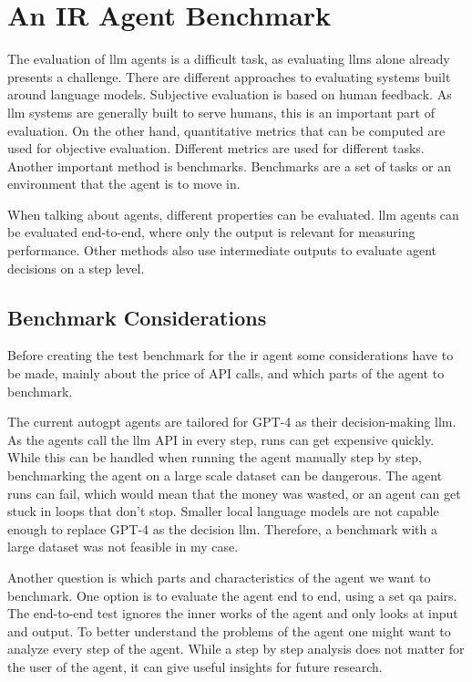 \documentclass[../main.tex]{subfiles}
\begin{document}
\chapter{An IR Agent Benchmark}
\label{ch:benchmarks}

The evaluation of \gls{llm} agents is a difficult task,
as evaluating \glspl{llm} alone already presents a challenge. %
There are different approaches to evaluating systems built around language models.
Subjective evaluation is based on human feedback.
As \gls{llm} systems are generally built to serve humans, this is an important part of evaluation.
On the other hand,
quantitative metrics that can be computed are used for objective evaluation.
Different metrics are used for different tasks. Another important method is benchmarks.
Benchmarks are a set of tasks or an environment that the agent is to move in.

When talking about agents, different properties can be evaluated.
\gls{llm} agents can be evaluated end-to-end, where only the output is
relevant for measuring performance.
Other methods also use intermediate outputs to evaluate agent decisions on a step level.

\section{Benchmark Considerations}

Before creating the test benchmark for the \gls{ir} agent some considerations
have to be made, mainly about the price of API calls, and which parts of the agent
to benchmark.

The current \gls{autogpt} agents are tailored for GPT-4 as their decision-making
\gls{llm}.
As the agents call the \gls{llm} API in every step,
runs can get expensive quickly.
While this can be handled when running the agent manually step by step,
benchmarking the agent on a large scale dataset can be dangerous.
The agent runs can fail, which would mean that the money was wasted,
or an agent can get stuck in loops that don't stop.
Smaller local language models are not capable enough to replace GPT-4
as the decision \gls{llm}.
Therefore, a benchmark with a large dataset was not feasible in my case.

Another question is which parts and characteristics of the agent we want to benchmark.
One option is to evaluate the agent end to end, using a set \gls{qa} pairs.
The end-to-end test ignores the inner works of the agent and only looks at
input and output.
To better understand the problems of the agent one might want to analyze every
step of the agent.
While a step by step analysis does not matter for the user of the agent,
it can give useful insights for future research.
\end{document}
